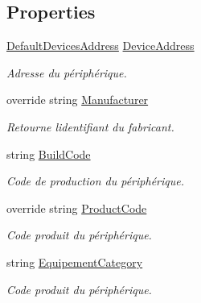 \subsection*{Properties}
\begin{DoxyCompactItemize}
\item 
\mbox{\hyperlink{namespace_device_library_a4ca177654b0e196e5a5f5275fb4ea5ee}{Default\+Devices\+Address}} \mbox{\hyperlink{class_device_library_1_1_ccc_talk_aff70a9d7d6adc3e95593259d17751cb8}{Device\+Address}}
\begin{DoxyCompactList}\small\item\em Adresse du périphérique. \end{DoxyCompactList}\item 
override string \mbox{\hyperlink{class_device_library_1_1_ccc_talk_a73a84f7534b5b9ff129897b86d483f48}{Manufacturer}}
\begin{DoxyCompactList}\small\item\em Retourne l\textquotesingle{}identifiant du fabricant. \end{DoxyCompactList}\item 
string \mbox{\hyperlink{class_device_library_1_1_ccc_talk_ae73c18703dae000c9f725a44fae17f1a}{Build\+Code}}
\begin{DoxyCompactList}\small\item\em Code de production du périphérique. \end{DoxyCompactList}\item 
override string \mbox{\hyperlink{class_device_library_1_1_ccc_talk_abd92229809b4474129b15e638fd56da7}{Product\+Code}}
\begin{DoxyCompactList}\small\item\em Code produit du périphérique. \end{DoxyCompactList}\item 
string \mbox{\hyperlink{class_device_library_1_1_ccc_talk_a3cb80b7a82cc363e0dcefd1f31ced8a2}{Equipement\+Category}}
\begin{DoxyCompactList}\small\item\em Code produit du périphérique. \end{DoxyCompactList}\item 

\end{DoxyCompactItemize}
